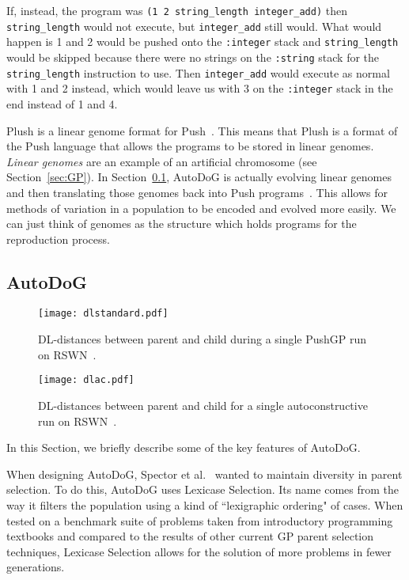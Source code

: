 \documentclass{sig-alternate}
\begin{document}
If, instead, the program was \texttt{(1 2 string\_length integer\_add)} then \texttt{string\_length} would not execute, but \texttt{integer\_add} still would. What would happen is 1 and 2 would be pushed onto the \texttt{:integer} stack and \texttt{string\_length} would be skipped because there were no strings on the \texttt{:string} stack for the \texttt{string\_length} instruction to use. Then \texttt{integer\_add} would execute as normal with 1 and 2 instead, which would leave us with 3 on the \texttt{:integer} stack in the end instead of 1 and 4.

Plush is a linear genome format for Push~\cite{spector:2016}. This means that Plush is a format of the Push language that allows the programs to be stored in linear genomes. \textit{Linear genomes} are an example of an artificial chromosome (see Section~\ref{sec:GP}). In Section~\ref{sec:autodog}, AutoDoG is actually evolving linear genomes and then translating those genomes back into Push programs~\cite{spector:2016}. This allows for methods of variation in a population to be encoded and evolved more easily. We can just think of genomes as the structure which holds programs for the reproduction process.

\subsection{AutoDoG}
\label{sec:autodog}

\begin{figure*}
	\centering
	\begin{minipage}[b]{0.4\textwidth}
		\texttt{[image: dlstandard.pdf]}
		\caption{DL-distances between parent and child during a single PushGP run on RSWN~\cite{spector:2016}.}
		\label{fig:standard}
	\end{minipage}
	\hfill
	\begin{minipage}[b]{0.4\textwidth}
		\texttt{[image: dlac.pdf]}
		\caption{DL-distances between parent and child for a single autoconstructive run on RSWN~\cite{spector:2016}.}
		\label{fig:ac}
	\end{minipage}
\end{figure*}

In this Section, we briefly describe some of the key features of AutoDoG.

When designing AutoDoG, Spector et al.~\cite{spector:2016} wanted to maintain diversity in parent selection. To do this, AutoDoG uses Lexicase Selection. Its name comes from the way it filters the population using a kind of ``lexigraphic ordering" of cases. When tested on a benchmark suite of problems taken from introductory programming textbooks and compared to the results of other current GP parent selection techniques, Lexicase Selection allows for the solution of more problems in fewer generations.
\end{document}
